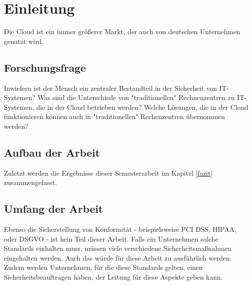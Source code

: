 \newpage
\section{Einleitung} \label{Einleitung}
Die Cloud ist ein immer größerer Markt, der auch von deutschen Unternehmen genutzt wird.


\subsection{Forschungsfrage}
Inwiefern ist der Mensch ein zentraler Bestandteil in der Sicherheit von IT-Systemen?
Was sind die Unterschiede von "traditionellen" Rechnenzentren zu IT-Systemen, die in der Cloud betrieben werden?
Welche Lösungen, die in der Cloud funktionieren können auch in "traditionellen" Rechenzentren übernommen werden?

\subsection{Aufbau der Arbeit}

Zuletzt werden die Ergebnisse dieser Semesterarbeit im Kapitel \ref{fazit} zusammengefasst.

\subsection{Umfang der Arbeit}

Ebenso die Sicherstellung von Konformität - beispielsweise PCI DSS, HIPAA, oder
DSGVO - ist kein Teil dieser Arbeit. Falls ein Unternehmen solche
Standards einhalten muss, müssen viele verschiedene Sicherheitsmaßnahmen
eingehalten werden. Auch das würde für diese Arbeit zu ausführlich werden. Zudem
werden Unternehmen, für die diese Standards gelten, einen Sicherheitsbeauftragen
haben, der Leitung für diese Aspekte geben kann.
